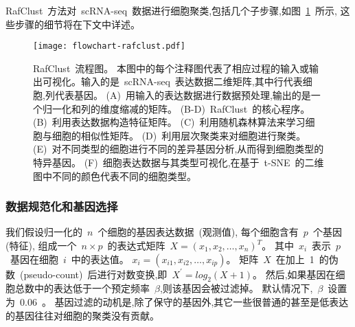 RafClust~方法对~scRNA-seq~数据进行细胞聚类,包括几个子步骤,如图~\ref{fig:rafclust}~所示, 这些步骤的细节将在下文中详述。
\begin{figure}[!htbp]
    \centering
    \texttt{[image: flowchart-rafclust.pdf]}
    \caption{RafClust~流程图。
    本图中的每个注释图代表了相应过程的输入或输出可视化。输入的是~scRNA-seq~表达数据二维矩阵,其中行代表细胞,列代表基因。
    (A)~用输入的表达数据进行数据预处理,输出的是一个归一化和列的维度缩减的矩阵。
    (B-D)~RafClust~的核心程序。
    (B)~利用表达数据构造特征矩阵。
    (C)~利用随机森林算法来学习细胞与细胞的相似性矩阵。
    (D)~利用层次聚类来对细胞进行聚类。
    (E)~对不同类型的细胞进行不同的差异基因分析,从而得到细胞类型的特异基因。
    (F)~细胞表达数据与其类型可视化,在基于~t-SNE~的二维图中不同的颜色代表不同的细胞类型。
    }
    \label{fig:rafclust}
\end{figure}

\subsubsection{数据规范化和基因选择}
\label{subsec:datapreprocessing} 

我们假设归一化的~$n$~个细胞的基因表达数据~(观测值), 每个细胞含有~$p$~个基因(特征),
组成一个~$n \times p$~的表达式矩阵~$X=\left(x_{1}, x_{2}, \ldots, x_{n} \right)^ T$。
其中~$x_{i}$~表示~$p$~基因在细胞~$i$~中的表达值。
$x_{i}=\left(x_{i1}, x_{i2},\ldots, x_{ip} \right)$。
矩阵~$X$~在加上~1~的伪数~(pseudo-count)~后进行对数变换,即~$X^{\prime} = log_2 (X + 1)$。
然后,如果基因在细胞总数中的表达低于一个预定频率~$\beta$,则该基因会被过滤掉。
默认情况下,~$\beta$~设置为~0.06~\cite{kiselev2017sc3}。 
基因过滤的动机是,除了保守的基因外,其它一些很普通的甚至是低表达的基因往往对细胞的聚类没有贡献。

